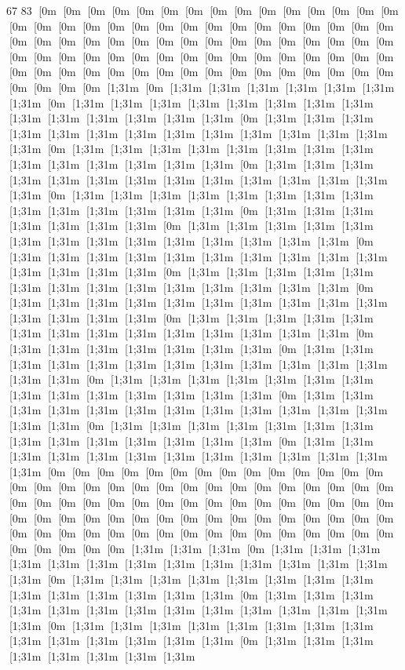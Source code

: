 67 83
[0m [0m [0m [0m [0m [0m [0m [0m [0m [0m [0m [0m [0m [0m [0m [0m [0m [0m [0m [0m [0m [0m [0m [0m [0m [0m [0m [0m [0m [0m [0m [0m [0m [0m [0m [0m [0m [0m [0m [0m [0m [0m [0m [0m [0m [0m [0m [0m [0m [0m [0m [0m [0m [0m [0m [0m [0m [0m [0m [0m [0m [0m [0m [0m [0m [0m [0m [0m [0m [0m [0m [0m [0m [0m [0m [0m [0m [0m [0m [0m [0m [0m [0m [1;31m [0m [1;31m [1;31m [1;31m [1;31m [1;31m [1;31m [1;31m [0m [1;31m [1;31m [1;31m [1;31m [1;31m [1;31m [1;31m [1;31m [1;31m [1;31m [1;31m [1;31m [1;31m [1;31m [0m [1;31m [1;31m [1;31m [1;31m [1;31m [1;31m [1;31m [1;31m [1;31m [1;31m [1;31m [1;31m [1;31m [1;31m [0m [1;31m [1;31m [1;31m [1;31m [1;31m [1;31m [1;31m [1;31m [1;31m [1;31m [1;31m [1;31m [1;31m [1;31m [0m [1;31m [1;31m [1;31m [1;31m [1;31m [1;31m [1;31m [1;31m [1;31m [1;31m [1;31m [1;31m [1;31m [1;31m [0m [1;31m [1;31m [1;31m [1;31m [1;31m [1;31m [1;31m [1;31m [1;31m [1;31m [1;31m [1;31m [1;31m [1;31m [0m [1;31m [1;31m [1;31m [1;31m [1;31m [1;31m [1;31m [0m [1;31m [1;31m [1;31m [1;31m [1;31m [1;31m [1;31m [1;31m [1;31m [1;31m [1;31m [1;31m [1;31m [1;31m [0m [1;31m [1;31m [1;31m [1;31m [1;31m [1;31m [1;31m [1;31m [1;31m [1;31m [1;31m [1;31m [1;31m [1;31m [0m [1;31m [1;31m [1;31m [1;31m [1;31m [1;31m [1;31m [1;31m [1;31m [1;31m [1;31m [1;31m [1;31m [1;31m [0m [1;31m [1;31m [1;31m [1;31m [1;31m [1;31m [1;31m [1;31m [1;31m [1;31m [1;31m [1;31m [1;31m [1;31m [0m [1;31m [1;31m [1;31m [1;31m [1;31m [1;31m [1;31m [1;31m [1;31m [1;31m [1;31m [1;31m [1;31m [1;31m [0m [1;31m [1;31m [1;31m [1;31m [1;31m [1;31m [1;31m [0m [1;31m [1;31m [1;31m [1;31m [1;31m [1;31m [1;31m [1;31m [1;31m [1;31m [1;31m [1;31m [1;31m [1;31m [0m [1;31m [1;31m [1;31m [1;31m [1;31m [1;31m [1;31m [1;31m [1;31m [1;31m [1;31m [1;31m [1;31m [1;31m [0m [1;31m [1;31m [1;31m [1;31m [1;31m [1;31m [1;31m [1;31m [1;31m [1;31m [1;31m [1;31m [1;31m [1;31m [0m [1;31m [1;31m [1;31m [1;31m [1;31m [1;31m [1;31m [1;31m [1;31m [1;31m [1;31m [1;31m [1;31m [1;31m [0m [1;31m [1;31m [1;31m [1;31m [1;31m [1;31m [1;31m [1;31m [1;31m [1;31m [1;31m [1;31m [1;31m [0m [0m [0m [0m [0m [0m [0m [0m [0m [0m [0m [0m [0m [0m [0m [0m [0m [0m [0m [0m [0m [0m [0m [0m [0m [0m [0m [0m [0m [0m [0m [0m [0m [0m [0m [0m [0m [0m [0m [0m [0m [0m [0m [0m [0m [0m [0m [0m [0m [0m [0m [0m [0m [0m [0m [0m [0m [0m [0m [0m [0m [0m [0m [0m [0m [0m [0m [0m [0m [0m [0m [0m [0m [0m [0m [0m [0m [0m [0m [0m [0m [0m [0m [1;31m [1;31m [1;31m [0m [1;31m [1;31m [1;31m [1;31m [1;31m [1;31m [1;31m [1;31m [1;31m [1;31m [1;31m [1;31m [1;31m [1;31m [0m [1;31m [1;31m [1;31m [1;31m [1;31m [1;31m [1;31m [1;31m [1;31m [1;31m [1;31m [1;31m [1;31m [1;31m [0m [1;31m [1;31m [1;31m [1;31m [1;31m [1;31m [1;31m [1;31m [1;31m [1;31m [1;31m [1;31m [1;31m [1;31m [0m [1;31m [1;31m [1;31m [1;31m [1;31m [1;31m [1;31m [1;31m [1;31m [1;31m [1;31m [1;31m [1;31m [1;31m [0m [1;31m [1;31m [1;31m [1;31m [1;31m [1;31m [1;31m [1;31m 